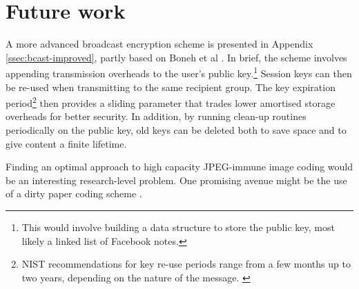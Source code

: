 \section{Future work}
\label{sec:future}

A more advanced broadcast encryption scheme is presented in Appendix \ref{ssec:bcast-improved}, partly based on Boneh et al \cite{boneh}. In brief, the scheme involves appending transmission overheads to the user's public key.\footnote{This would involve building a data structure to store the public key, most likely a linked list of Facebook notes.} Session keys can then be re-used when transmitting to the same recipient group. The key expiration period\footnote{NIST recommendations for key re-use periods range from a few months up to two years, depending on the nature of the message. \cite{nist-key}} then provides a sliding parameter that trades lower amortised storage overheads for better security. In addition, by running clean-up routines periodically on the public key, old keys can be deleted both to save space and to give content a finite lifetime.

Finding an optimal approach to high capacity JPEG-immune image coding would be an interesting research-level problem. One promising avenue might be the use of a dirty paper coding scheme \cite{dpaper}.







